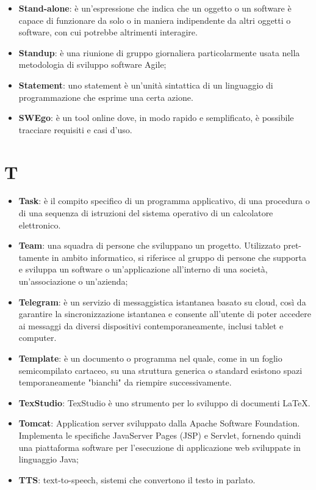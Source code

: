 \documentclass[a4paper, oneside, openany]{article}
\begin{document}
\begin{itemize}
\item \textbf{Stand-alone}: è un'espressione che indica che un oggetto o un software è capace di funzionare da solo o in maniera indipendente da altri oggetti o software, con cui potrebbe altrimenti interagire.
\item \textbf{Standup}: è una riunione di gruppo giornaliera particolarmente usata nella metodologia di sviluppo software Agile;
\item \textbf{Statement}: uno statement è un'unità sintattica di un linguaggio di programmazione che esprime una certa azione.
\item \textbf{SWEgo}: è un tool online dove, in modo rapido e semplificato, è possibile tracciare requisiti e casi d'uso.
\end{itemize}

\section{T}
\begin{itemize}
\item \textbf{Task}: è il compito specifico di un programma applicativo, di una procedura o di una sequenza di istruzioni del sistema operativo di un calcolatore elettronico.
\item \textbf{Team}: una squadra di persone che sviluppano un progetto. Utilizzato pret-
tamente in ambito informatico, si riferisce al gruppo di persone che supporta e sviluppa
un software o un’applicazione all’interno di una società, un’associazione o un’azienda;
\item \textbf{Telegram}: è un servizio di messaggistica istantanea basato su cloud, così da garantire la sincronizzazione istantanea e consente all'utente di poter accedere ai messaggi da diversi dispositivi contemporaneamente, inclusi tablet e computer.
\item \textbf{Template}: è un documento o programma nel quale, come in un foglio semicompilato cartaceo, su una struttura generica o standard esistono spazi temporaneamente "bianchi" da riempire successivamente.
\item \textbf{TexStudio}: TexStudio è uno strumento per lo sviluppo di documenti LaTeX.
\item \textbf{Tomcat}: Application server sviluppato dalla Apache Software Foundation. Implementa le specifiche JavaServer Pages (JSP) e Servlet, fornendo quindi una piattaforma software per l’esecuzione di applicazione web sviluppate in linguaggio Java;
\item \textbf{TTS}: text-to-speech, sistemi che convertono il testo in parlato.
\end{itemize}
\end{document}
